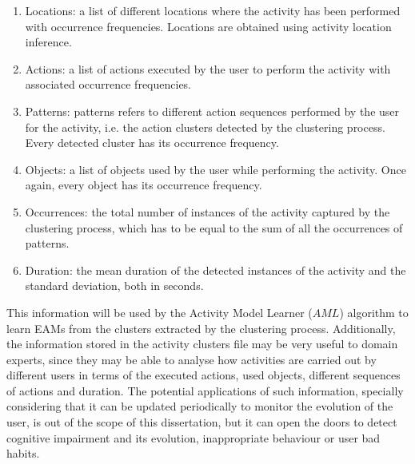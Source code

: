 \begin{enumerate}
 \item Locations: a list of different locations where the activity has been performed with occurrence frequencies. Locations are obtained using activity location inference.
 \item Actions: a list of actions executed by the user to perform the activity with associated occurrence frequencies.
 \item Patterns: patterns refers to different action sequences performed by the user for the activity, i.e. the action clusters detected by the clustering process. Every detected cluster has its occurrence frequency. 
 \item Objects: a list of objects used by the user while performing the activity. Once again, every object has its occurrence frequency.
 \item Occurrences: the total number of instances of the activity captured by the clustering process, which has to be equal to the sum of all the occurrences of patterns. 
 \item Duration: the mean duration of the detected instances of the activity and the standard deviation, both in seconds.
\end{enumerate}

This information will be used by the Activity Model Learner ($AML$) algorithm to learn EAMs from the clusters extracted by the clustering process. Additionally, the information stored in the activity clusters file may be very useful to domain experts, since they may be able to analyse how activities are carried out by different users in terms of the executed actions, used objects, different sequences of actions and duration. The potential applications of such information, specially considering that it can be updated periodically to monitor the evolution of the user, is out of the scope of this dissertation, but it can open the doors to detect cognitive impairment and its evolution, inappropriate behaviour or user bad habits. 